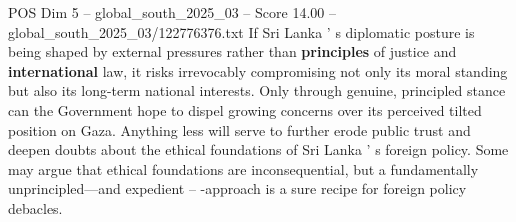 \begin{textsample}{POS Dim 5 – global\_south\_2025\_03 – Score 14.00 – global\_south\_2025\_03/122776376.txt}
If Sri Lanka ' s diplomatic posture is being shaped by external pressures rather than \textbf{principles} of justice and \textbf{international} law, it risks irrevocably compromising not only its moral standing but also its long-term national interests.
Only through genuine, principled stance can the Government hope to dispel growing concerns over its perceived tilted position on Gaza.
Anything less will serve to further erode public trust and deepen doubts about the ethical foundations of Sri Lanka ' s foreign policy.
Some may argue that ethical foundations are inconsequential, but a fundamentally unprincipled---and expedient -- -approach is a sure recipe for foreign policy debacles.

\end{textsample}
